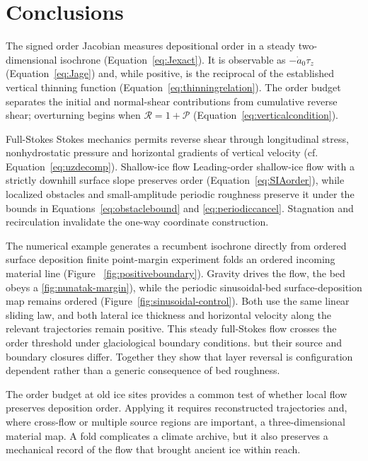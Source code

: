 \documentclass[review]{igs}
\providecommand{\DIFadd}[1]{{\protect\color{blue} \sf #1}} %
\providecommand{\DIFdel}[1]{{\protect\color{red} \scriptsize #1}} %
\providecommand{\DIFaddbegin}{} %
\providecommand{\DIFaddend}{} %
\providecommand{\DIFdelbegin}{} %
\providecommand{\DIFdelend}{} %
\newcommand{\DIFscaledelfig}{0.5}
\newlength{\DIFdelgraphicswidth} %
\newlength{\DIFdelgraphicsheight} %
\newcommand{\DIFaddincludegraphics}[2][]{{\color{blue}\fbox{\DIFOincludegraphics[#1]{#2}}}} %
\newcommand{\DIFdelincludegraphics}[2][]{%
\sbox{\DIFdelgraphicsbox}{\DIFOincludegraphics[#1]{#2}}%
\settoboxwidth{\DIFdelgraphicswidth}{\DIFdelgraphicsbox} %
\settoboxtotalheight{\DIFdelgraphicsheight}{\DIFdelgraphicsbox} %
\scalebox{\DIFscaledelfig}{%
\parbox[b]{\DIFdelgraphicswidth}{\usebox{\DIFdelgraphicsbox}\\[-\baselineskip] \rule{\DIFdelgraphicswidth}{0em}}\llap{\resizebox{\DIFdelgraphicswidth}{\DIFdelgraphicsheight}{%
\setlength{\unitlength}{\DIFdelgraphicswidth}%
\begin{picture}(1,1)%
\thicklines\linethickness{2pt} %
{\color[rgb]{1,0,0}\put(0,0){\framebox(1,1){}}}%
{\color[rgb]{1,0,0}\put(0,0){\line( 1,1){1}}}%
{\color[rgb]{1,0,0}\put(0,1){\line(1,-1){1}}}%
\end{picture}%
}\hspace*{3pt}}} %
} %
\DeclareRobustCommand{\DIFaddbegin}{\DIFOaddbegin \let\includegraphics\DIFaddincludegraphics} %
\DeclareRobustCommand{\DIFaddend}{\DIFOaddend \let\includegraphics\DIFOincludegraphics} %
\DeclareRobustCommand{\DIFdelbegin}{\DIFOdelbegin \let\includegraphics\DIFdelincludegraphics} %
\DeclareRobustCommand{\DIFdelend}{\DIFOaddend \let\includegraphics\DIFOincludegraphics} %
\begin{document}
\section{Conclusions}

The signed order Jacobian measures depositional order in a steady two-dimensional isochrone (Equation~\ref{eq:Jexact}). It is observable as \(-\dot a_0\tau_z\) (Equation~\ref{eq:Jage}) and, while positive, is the reciprocal of the established vertical thinning function (Equation~\ref{eq:thinningrelation}). The order budget separates the initial and normal-shear contributions from cumulative reverse shear; overturning begins when \(\mathcal{R}=1+\mathcal{P}\) (Equation~\ref{eq:verticalcondition}).

\DIFdelbegin \DIFdel{Full-Stokes }\DIFdelend \DIFaddbegin \DIFadd{Stokes }\DIFaddend mechanics permits reverse shear through longitudinal stress, nonhydrostatic pressure and horizontal gradients of vertical velocity (cf. Equation~\ref{eq:uzdecomp}). \DIFdelbegin \DIFdel{Shallow-ice flow }\DIFdelend \DIFaddbegin \DIFadd{Leading-order shallow-ice flow with a strictly downhill surface slope }\DIFaddend preserves order (Equation~\ref{eq:SIAorder}), while localized obstacles and small-amplitude periodic roughness preserve it under the bounds in Equations~\ref{eq:obstaclebound} and \ref{eq:periodiccancel}. Stagnation and recirculation invalidate the one-way coordinate construction.

The \DIFdelbegin \DIFdel{numerical example generates a recumbent isochrone directly from ordered surface deposition }\DIFdelend \DIFaddbegin \DIFadd{finite point-margin experiment folds an ordered incoming material line }\DIFaddend (Figure~\DIFdelbegin \DIFdel{\ref{fig:positiveboundary}). Gravity drives the flow, the bed obeys a }\DIFdelend \DIFaddbegin \DIFadd{\ref{fig:nunatak-margin}), while the periodic sinusoidal-bed surface-deposition map remains ordered (Figure~\ref{fig:sinusoidal-control}). Both use the same }\DIFaddend linear sliding law, \DIFdelbegin \DIFdel{and both lateral ice thickness and horizontal velocity along the relevant trajectories remain positive. This steady full-Stokes flow crosses the order threshold under glaciological boundary conditions. }\DIFdelend \DIFaddbegin \DIFadd{but their source and boundary closures differ. Together they show that layer reversal is configuration dependent rather than a generic consequence of bed roughness.
}\DIFaddend 

The order budget at old ice sites provides a common test of whether local flow preserves deposition order. Applying it requires reconstructed trajectories and, where cross-flow or multiple source regions are important, a three-dimensional material map. A fold complicates a climate archive, but it also preserves a mechanical record of the flow that brought ancient ice within reach.
\end{document}
